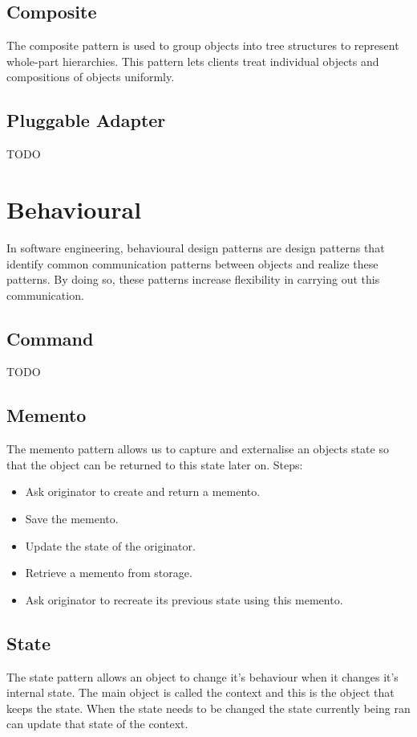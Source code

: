 \subsection{Composite}
The composite pattern is used to group objects into tree structures to represent whole-part hierarchies. This pattern lets clients treat individual objects and compositions of objects uniformly. \cite{sourcemaking}

\subsection{Pluggable Adapter}
TODO

\section{Behavioural}
In software engineering, behavioural design patterns are design patterns that identify common communication patterns between objects and realize these patterns. By doing so, these patterns increase flexibility in carrying out this communication. \cite{sourcemaking}

\subsection{Command}
TODO

\subsection{Memento}
The memento pattern allows us to capture and externalise an objects state so that the object can be returned to this state later on.
Steps:
\begin{itemize}
	\item Ask originator to create and return a memento.
	\item Save the memento.
	\item Update the state of the originator.
	\item Retrieve a memento from storage.
	\item Ask originator to recreate its previous state using this memento.
\end{itemize}

\subsection{State}
The state pattern allows an object to change it's behaviour when it changes it's internal state. The main object is called the context and this is the object that keeps the state. When the state needs to be changed the state currently being ran can update that state of the context.

